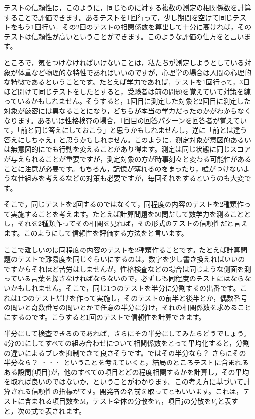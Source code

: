 \documentclass{ltjbook}
\begin{document}
テストの信頼性は，このように，同じものに対する複数の測定の相関係数を計算することで評価できます。あるテストを1回行って，少し期間を空けて同じテストをもう1回行い，その2回のテストの相関係数を算出して十分に高ければ，そのテストは信頼性が高いということができます。このような評価の仕方をと言います。

ところで，気をつけなければいけないことは，私たちが測定しようとしている対象が体重など物理的な特性であればいいのですが，心理学の場合は人間の心理的な特徴であるということです。たとえば学力であれば，テストを1回行って，3日ほど開けて同じテストをしたとすると，受験者は前の問題を覚えていて対策を練っているかもしれません。そうすると，1回目に測定した対象と2回目に測定した対象が厳密には異なることになり，どちらが本当の学力だったのかがわからなくなります。あるいは性格検査の場合，1回目の回答パターンを回答者が覚えていて，「前と同じ答えにしておこう」と思うかもしれませんし，逆に「前とは違う答えにしちゃえ」と思うかもしれません。このように，測定対象が意図的あるいは無意図的にでも行動を変えることがあり得ます。測定は同じ状態に同じスコアが与えられることが重要ですが，測定対象の方が時事刻々と変わる可能性があることに注意が必要です。もちろん，記憶が薄れるのをまったり，嘘がつけないような仕組みを考えるなどの対策も必要ですが，毎回それをするというのも大変です。

そこで，同じテストを2回するのではなくて，同程度の内容のテストを2種類作って実施することを考えます。たとえば計算問題を50問だして数学力を測ることとし，それを2種類作ってその相関を見れば，その形式のテストの信頼性だと言えます。このようにして信頼性を評価する方法をと言います。

ここで難しいのは同程度の内容のテストを2種類作ることです。たとえば計算問題のテストで難易度を同じぐらいにするのは，数字を少し書き換えればいいのですからそれほど苦労はしませんが，性格検査などの場合は同じような側面を測っている言葉を探さなければならないので，必ずしも同程度のテストにはならないかもしれません。そこで，同じ1つのテストを半分に分割するの出番です。これは1つのテストだけを作って実施し，そのテストの前半と後半とか，偶数番号の問いと奇数番号の問いとかで任意の半分に分け，それの相関係数を求めることにするのです。こうすると1回のテストで信頼性を計算できます。

半分にして検査できるのであれば，さらにその半分にしてみたらどうでしょう。4分の1にしてすべての組み合わせについて相関係数をとって平均化すると，分割の違いによるブレを抑制できて良さそうです。ではその半分なら？ さらにその半分なら？ ・・・
ということを考えていくと，結局のところテストに含まれるある設問(項目)が，他のすべての項目とどの程度相関するかを計算し，その平均を取れば良いのではないか，ということがわかります。この考え方に基づいて計算される信頼性の指標がです。開発者の名前を取ってともいいます。これは，テストに含まれる項目数をM，テスト全体の分散を$V_t$，項目jの分散を$V_j$と表すと，次の式で表されます。
\end{document}
